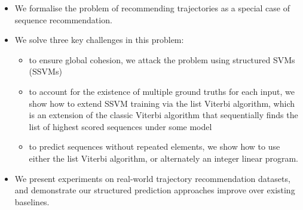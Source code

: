 \begin{itemize}[noitemsep,leftmargin=12pt]%
    \item We formalise the problem of recommending trajectories as a special case of sequence recommendation.          

	\item We solve three key challenges in this problem:
	\begin{itemize}
		\item to ensure global cohesion, we attack the problem using structured SVMs (SSVMs)
		\item to account for the existence of multiple ground truths for each input, we show how
		to extend SSVM training via the list Viterbi algorithm, 
        which is an extension of the classic Viterbi algorithm that sequentially finds the list of highest scored sequences under some model
		\item to predict sequences without repeated elements, we show how to use either the list Viterbi algorithm, or alternately an integer linear program.
	\end{itemize}

	\item We present experiments on real-world trajectory recommendation datasets, and demonstrate our structured prediction approaches improve over existing baselines. %





\end{itemize}
